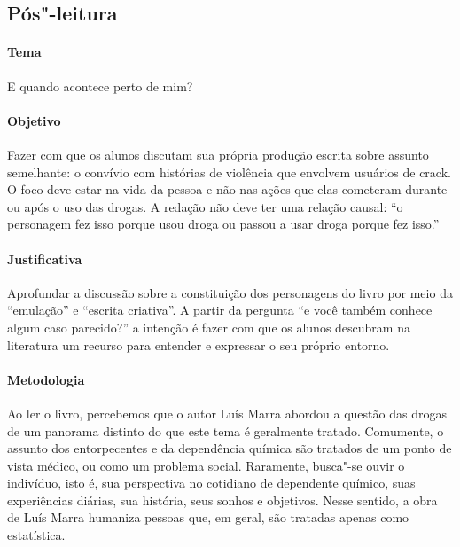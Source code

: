 \documentclass[11pt]{extarticle}
\begin{document}
\subsection{Pós"-leitura}


\paragraph{Tema} E quando acontece perto de mim? 
\paragraph{Objetivo} Fazer com que os alunos discutam sua própria produção escrita 
	sobre assunto semelhante: o convívio com histórias de violência que 
	envolvem usuários de crack. O foco deve estar na vida da pessoa e não 
	nas ações que elas cometeram durante ou após o uso das drogas. 
	A redação não deve ter uma relação causal: ``o personagem fez isso porque usou 
	droga ou passou a usar droga porque fez isso.'' 
\paragraph{Justificativa} Aprofundar a discussão sobre a constituição dos personagens 
	do livro por meio da ``emulação'' e ``escrita criativa''. A partir 
	da pergunta ``e você também conhece algum caso parecido?'' a intenção 
	é fazer com que os alunos descubram na literatura um recurso para 
	entender e expressar o seu próprio entorno.
\paragraph{Metodologia}
	Ao ler o livro, percebemos que o autor Luís Marra abordou a
	questão das drogas de um panorama distinto do que este tema é geralmente
	tratado. Comumente, o assunto dos entorpecentes e da dependência química
	são tratados de um ponto de vista médico, ou como um problema social.
	Raramente, busca"-se ouvir o indivíduo, isto é, sua perspectiva no
	cotidiano de dependente químico, suas experiências diárias, sua
	história, seus sonhos e objetivos. Nesse sentido, a obra de Luís Marra
	humaniza pessoas que, em geral, são tratadas apenas como estatística.
\end{document}

